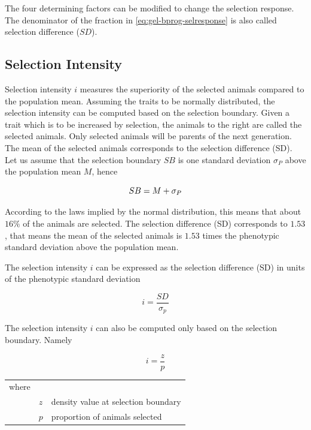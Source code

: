 \documentclass[
]{book}
\begin{document}
The four determining factors can be modified to change the selection response. The denominator of the fraction in \eqref{eq:gel-bprog-selresponse} is also called selection difference (\(SD\)).

\hypertarget{gel-bprog-selintensity}{%
\subsection{Selection Intensity}\label{gel-bprog-selintensity}}

Selection intensity \(i\) measures the superiority of the selected animals compared to the population mean. Assuming the traits to be normally distributed, the selection intensity can be computed based on the selection boundary. Given a trait which is to be increased by selection, the animals to the right are called the selected animals. Only selected animals will be parents of the next generation. The mean of the selected animals corresponds to the selection difference (SD). Let us assume that the selection boundary \(SB\) is one standard deviation \(\sigma_P\) above the population mean \(M\), hence

\begin{equation}
SB = M + \sigma_P \notag
\end{equation}

According to the laws implied by the normal distribution, this means that about \(16\%\) of the animals are selected. The selection difference (SD) corresponds to \(1.53\), that means the mean of the selected animals is \(1.53\) times the phenotypic standard deviation above the population mean.

The selection intensity \(i\) can be expressed as the selection difference (SD) in units of the phenotypic standard deviation

\begin{equation}
i = \frac{SD}{\sigma_p}
\label{eq:gel-bprog-seltint}
\end{equation}

The selection intensity \(i\) can also be computed only based on the selection boundary. Namely

\begin{equation}
i = \frac{z}{p}
\label{eq:gel-bprog-seltintselbound}
\end{equation}

\begin{tabular}{lll}
where  &  &  \\
       &  $z$         &  density value at selection boundary \\
       &  $p$         &  proportion of animals selected 
\end{tabular}
\end{document}
